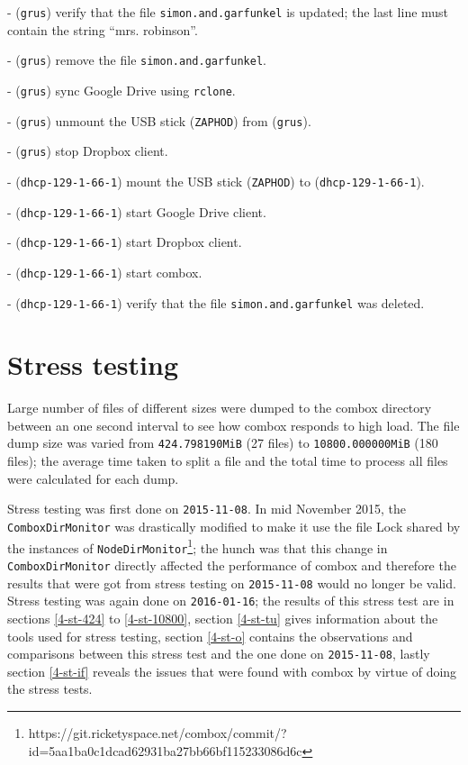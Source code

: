   - (\verb+grus+) verify that the file \verb+simon.and.garfunkel+ is
  updated; the last line must contain the string ``mrs. robinson''.

  - (\verb+grus+) remove the file \verb+simon.and.garfunkel+.

  - (\verb+grus+) sync Google Drive using \verb+rclone+.

  - (\verb+grus+) unmount the USB stick (\verb+ZAPHOD+) from
  (\verb+grus+).

  - (\verb+grus+) stop Dropbox client.

  - (\verb+dhcp-129-1-66-1+) mount the USB stick (\verb+ZAPHOD+) to
  (\verb+dhcp-129-1-66-1+).

  - (\verb+dhcp-129-1-66-1+) start Google Drive client.

  - (\verb+dhcp-129-1-66-1+) start Dropbox client.

  - (\verb+dhcp-129-1-66-1+) start combox.

  - (\verb+dhcp-129-1-66-1+) verify that the file
  \verb+simon.and.garfunkel+ was deleted.


\section{Stress testing}

Large number of files of different sizes were dumped to the combox
directory between an one second interval to see how combox responds to
high load. The file dump size was varied from \verb+424.798190MiB+ (27
files) to \verb+10800.000000MiB+ (180 files); the average time taken
to split a file and the total time to process all files were
calculated for each dump.

Stress testing was first done on \verb+2015-11-08+. In mid November
2015, the \verb+ComboxDirMonitor+ was drastically modified to make it
use the file Lock shared by the instances of
\verb+NodeDirMonitor+\footnote{https://git.ricketyspace.net/combox/commit/?id=5aa1ba0c1dcad62931ba27bb66bf115233086d6c};
the hunch was that this change in \verb+ComboxDirMonitor+ directly
affected the performance of combox and therefore the results that were
got from stress testing on \verb+2015-11-08+ would no longer be
valid. Stress testing was again done on \verb+2016-01-16+; the results
of this stress test are in sections \ref{4-st-424} to
\ref{4-st-10800}, section \ref{4-st-tu} gives information about the
tools used for stress testing, section \ref{4-st-o} contains the
observations and comparisons between this stress test and the one done
on \verb+2015-11-08+, lastly section \ref{4-st-if} reveals the issues
that were found with combox by virtue of doing the stress tests.

